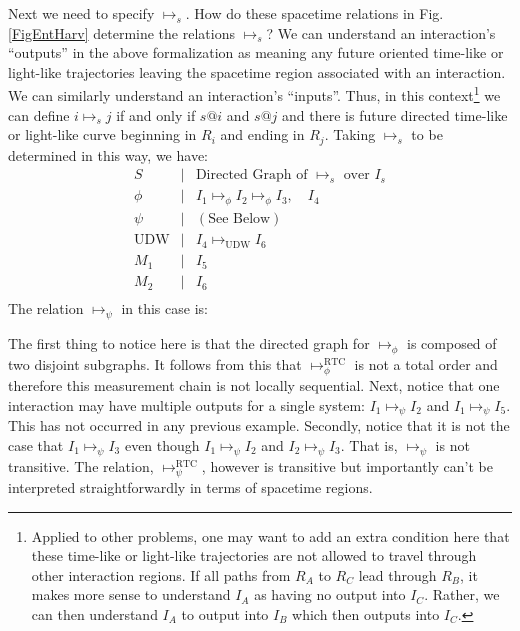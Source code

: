 \documentclass[12pt,prd,superscriptaddress,floatfix,amsmath,amssymb,amsfonts,nofootinbib]{revtex4-2}
\begin{document}
Next we need to specify $\mapsto_s$. How do these spacetime relations in Fig. \ref{FigEntHarv} determine the relations $\mapsto_s$? We can understand an interaction's ``outputs'' in the above formalization as meaning any future oriented time-like or light-like trajectories leaving the spacetime region associated with an interaction. We can similarly understand an interaction's ``inputs''. Thus, in this context\footnote{Applied to other problems, one may want to add an extra condition here that these time-like or light-like trajectories are not allowed to travel through other interaction regions. If all paths from $R_A$ to $R_C$ lead through $R_B$, it makes more sense to understand $I_A$ as having no output into $I_C$. Rather, we can then understand $I_A$ to output into $I_B$ which then outputs into $I_C$.} we can define $i\mapsto_s j$ if and only if $s@i$ and $s@j$ and there is future directed time-like or light-like curve beginning in $R_i$ and ending in $R_j$. Taking $\mapsto_s$ to be determined in this way, we have:
\[\begin{array}{ccl}
S & \vert & \text{Directed Graph of }\mapsto_s\text{ over }I_s\\
\phi & \vert & I_1\mapsto_\phi I_2\mapsto_\phi I_3, \quad I_4\\
\psi & \vert & (\text{See Below})\\
\text{UDW} & \vert & I_4\mapsto_\text{UDW} I_6\\
M_1 & \vert & I_5\\
M_2 & \vert & I_6\\
\end{array}\]
The relation $\mapsto_\psi$ in this case is:
\begin{center}
\end{center}
The first thing to notice here is that the directed graph for $\mapsto_\phi$ is composed of two disjoint subgraphs. It follows from this that $\mapsto_\phi^\text{RTC}$ is not a total order and therefore this measurement chain is not locally sequential. Next, notice that one interaction may have multiple outputs for a single system: $I_1\mapsto_\psi I_2$ and $I_1\mapsto_\psi I_5$. This has not occurred in any previous example. Secondly, notice that it is not the case that $I_1\mapsto_\psi I_3$ even though $I_1\mapsto_\psi I_2$ and $I_2\mapsto_\psi I_3$. That is, $\mapsto_\psi$ is not transitive. The relation, $\mapsto_\psi^\text{RTC}$, however is transitive but importantly can't be interpreted straightforwardly in terms of spacetime regions.
\end{document}
